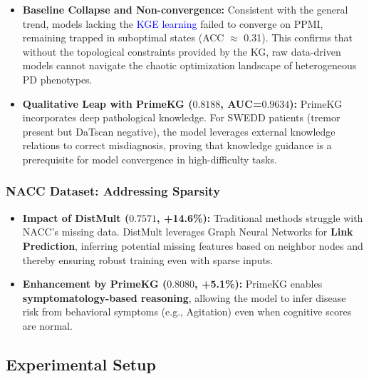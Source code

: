 \documentclass[sn-mathphys-num]{sn-jnl}%
\theoremstyle{thmstyleone}%
\theoremstyle{thmstyletwo}%
\theoremstyle{thmstylethree}%
\begin{document}
    \begin{itemize}
        \item \textbf{Baseline Collapse and Non-convergence:} Consistent with the general trend, models lacking the \textcolor{blue}{KGE learning} failed to converge on PPMI, remaining trapped in suboptimal states (ACC $\approx$ 0.31). This confirms that without the topological constraints provided by the KG, raw data-driven models cannot navigate the chaotic optimization landscape of heterogeneous PD phenotypes.
        \item \textbf{Qualitative Leap with PrimeKG ($0.8188$, AUC=$0.9634$):} PrimeKG incorporates deep pathological knowledge. For SWEDD patients (tremor present but DaTscan negative), the model leverages external knowledge relations to correct misdiagnosis, proving that knowledge guidance is a prerequisite for model convergence in high-difficulty tasks.
    \end{itemize}

\subsubsection{NACC Dataset: Addressing Sparsity}

    \begin{itemize}
        \item \textbf{Impact of DistMult ($0.7571$, +14.6\%):} Traditional methods struggle with NACC's missing data. DistMult leverages Graph Neural Networks for \textbf{Link Prediction}, inferring potential missing features based on neighbor nodes and thereby ensuring robust training even with sparse inputs.
        \item \textbf{Enhancement by PrimeKG ($0.8080$, +5.1\%):} PrimeKG enables \textbf{symptomatology-based reasoning}, allowing the model to infer disease risk from behavioral symptoms (e.g., Agitation) even when cognitive scores are normal.
    \end{itemize}

\subsection{Experimental Setup}
\end{document}
